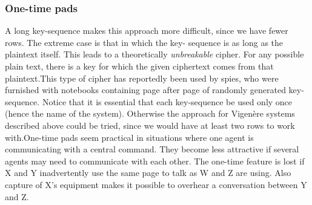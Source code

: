 \subsubsection*{One-time pads}
\pq A long key-sequence makes this approach more difficult, since
we have fewer rows.  The extreme case is that in which the key-%
sequence is as long as the plaintext itself.  This leads to a
theoretically {\it unbreakable\/} cipher.  For any possible plain%
text, there is a key for which the given ciphertext comes from
that plaintext.\pq This type of cipher has reportedly been used
by spies, who were furnished with notebooks containing page after
page of randomly generated key-sequence.  Notice that it is essential
that each key-sequence be used only once (hence the name of the
system).  Otherwise the approach for Vigen\`ere systems described
above could be tried, since we would have at least two rows to
work with.\pq One-time pads seem practical in situations where one
agent is communicating with a central command.  They become less
attractive if several agents may
need to communicate with each other.  The one-time feature is lost
if X and Y inadvertently use the same page to talk as W and Z are
using.  Also capture of X's equipment makes it possible to overhear
a conversation between Y and Z.
